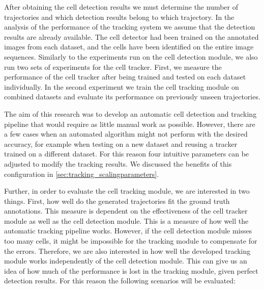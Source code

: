 	After obtaining the cell detection results we must determine the number of trajectories and which detection results belong to which trajectory. In the analysis of the performance of the tracking system we assume that the detection results are already available. The cell detector had been trained on the annotated images from each dataset, and the cells have been identified on the entire image sequences. Similarly to the experiments run on the cell detection module, we also run two sets of experiments for the cell tracker. First, we measure the performance of the cell tracker after being trained and tested on each dataset individually. In the second experiment we train the cell tracking module on combined datasets and evaluate its performance on previously unseen trajectories.
	
	The aim of this research was to develop an automatic cell detection and tracking pipeline that would require as little manual work as possible. However, there are a few cases when an automated algorithm might not perform with the desired accuracy, for example when testing on a new dataset and reusing a tracker trained on a different dataset. For this reason four intuitive parameters can be adjusted to modify the tracking results. We discussed the benefits of this configuration in \cref{sec:tracking_scalingparameters}.
	
	Further, in order to evaluate the cell tracking module, we are interested in two things. First, how well do the generated trajectories fit the ground truth annotations. This measure is dependent on the effectiveness of the cell tracker module as well as the cell detection module. This is a measure of how well the automatic tracking pipeline works. However, if the cell detection module misses too many cells, it might be impossible for the tracking module to compensate for the errors. Therefore, we are also interested in how well the developed tracking module works independently of the cell detection module. This can give us an idea of how much of the performance is lost in the tracking module, given perfect detection results. For this reason the following scenarios will be evaluated:
	
